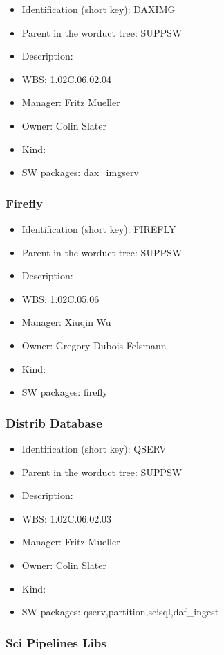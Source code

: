 \begin{itemize}\item Identification (short key): DAXIMG
\item Parent in the worduct tree: SUPPSW
\item Description: 
\item WBS: 1.02C.06.02.04
\item Manager: Fritz Mueller
\item Owner: Colin Slater
\item Kind:
\item SW packages: dax\_imgserv
\end{itemize}\subsubsection{Firefly}
\begin{itemize}\item Identification (short key): FIREFLY
\item Parent in the worduct tree: SUPPSW
\item Description: 
\item WBS: 1.02C.05.06
\item Manager: Xiuqin Wu
\item Owner: Gregory Dubois-Felsmann
\item Kind:
\item SW packages: firefly
\end{itemize}\subsubsection{Distrib Database}
\begin{itemize}\item Identification (short key): QSERV
\item Parent in the worduct tree: SUPPSW
\item Description: 
\item WBS: 1.02C.06.02.03
\item Manager: Fritz Mueller
\item Owner: Colin Slater
\item Kind:
\item SW packages: qserv,partition,scisql,daf\_ingest
\end{itemize}\subsubsection{Sci Pipelines Libs}
